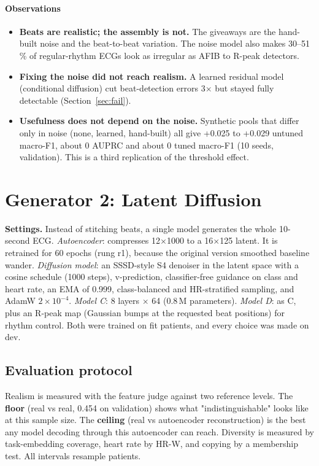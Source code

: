 \documentclass[11pt,a4paper]{article}
\newcommand{\obs}{\paragraph{Observations}}
\newcommand{\settings}[1]{\noindent\textbf{Settings.} #1\par\medskip}
\begin{document}
\obs
\begin{itemize}
\item \textbf{Beats are realistic; the assembly is not.} The giveaways are the hand-built noise and the beat-to-beat
  variation. The noise model also makes 30--51\,\% of regular-rhythm ECGs look as irregular as AFIB to R-peak
  detectors.
\item \textbf{Fixing the noise did not reach realism.} A learned residual model (conditional diffusion) cut
  beat-detection errors 3$\times$ but stayed fully detectable (Section~\ref{sec:fail}).
\item \textbf{Usefulness does not depend on the noise.} Synthetic pools that differ only in noise (none, learned,
  hand-built) all give +0.025 to +0.029 untuned macro-F1, about 0 AUPRC and about 0 tuned macro-F1 (10 seeds,
  validation). This is a third replication of the threshold effect.
\end{itemize}

\section{Generator 2: Latent Diffusion}\label{sec:latent}
\settings{Instead of stitching beats, a single model generates the whole 10-second ECG.
\emph{Autoencoder}: compresses 12$\times$1000 to a 16$\times$125 latent. It is retrained for 60 epochs (rung r1),
because the original version smoothed baseline wander.
\emph{Diffusion model}: an SSSD-style S4 denoiser in the latent space with a cosine schedule (1000 steps),
v-prediction, classifier-free guidance on class and heart rate, an EMA of 0.999, class-balanced and HR-stratified
sampling, and AdamW $2\times10^{-4}$.
\emph{Model C}: 8 layers $\times$ 64 (0.8\,M parameters).
\emph{Model D}: as C, plus an R-peak map (Gaussian bumps at the requested beat positions) for rhythm control.
Both were trained on fit patients, and every choice was made on dev.}

\subsection{Evaluation protocol}
Realism is measured with the feature judge against two reference levels. The \textbf{floor} (real vs real, 0.454 on
validation) shows what "indistinguishable" looks like at this sample size. The \textbf{ceiling} (real vs autoencoder
reconstruction) is the best any model decoding through this autoencoder can reach. Diversity is measured by
task-embedding coverage, heart rate by HR-W, and copying by a membership test. All intervals resample patients.
\end{document}
